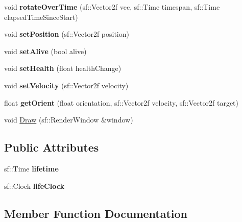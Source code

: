 \begin{DoxyCompactItemize}
\item 
\mbox{\label{class_seeker_missile_aa730a51000b8b61385d5725febda4962}} 
void {\bfseries rotate\+Over\+Time} (sf\+::\+Vector2f vec, sf\+::\+Time timespan, sf\+::\+Time elapsed\+Time\+Since\+Start)
\item 
\mbox{\label{class_seeker_missile_a9ab2ce9cc84d0cd47a6be437025dd0d3}} 
void {\bfseries set\+Position} (sf\+::\+Vector2f position)
\item 
\mbox{\label{class_seeker_missile_ac0d126a95002d312305b51f3625a728b}} 
void {\bfseries set\+Alive} (bool alive)
\item 
\mbox{\label{class_seeker_missile_abdafa685dda98c78488c54629d427d58}} 
void {\bfseries set\+Health} (float health\+Change)
\item 
\mbox{\label{class_seeker_missile_a9621e4dca70af019f083681c6ee1d6c2}} 
void {\bfseries set\+Velocity} (sf\+::\+Vector2f velocity)
\item 
\mbox{\label{class_seeker_missile_acb47a64a571ad9660ebe47ebd1595d20}} 
float {\bfseries get\+Orient} (float orientation, sf\+::\+Vector2f velocity, sf\+::\+Vector2f target)
\item 
void \mbox{\hyperlink{class_seeker_missile_a8744918a81a590920c2555ac68dac04c}{Draw}} (sf\+::\+Render\+Window \&window)
\end{DoxyCompactItemize}
\subsection*{Public Attributes}
\begin{DoxyCompactItemize}
\item 
\mbox{\label{class_seeker_missile_a22f333589b0567df4a2442f892a4e530}} 
sf\+::\+Time {\bfseries lifetime}
\item 
\mbox{\label{class_seeker_missile_a1c589b64ef67acfb3881c80067edcd4a}} 
sf\+::\+Clock {\bfseries life\+Clock}
\end{DoxyCompactItemize}


\subsection{Member Function Documentation}
\mbox{\label{class_seeker_missile_afd7d8339af95452635f7ed84373c66b0}} 
